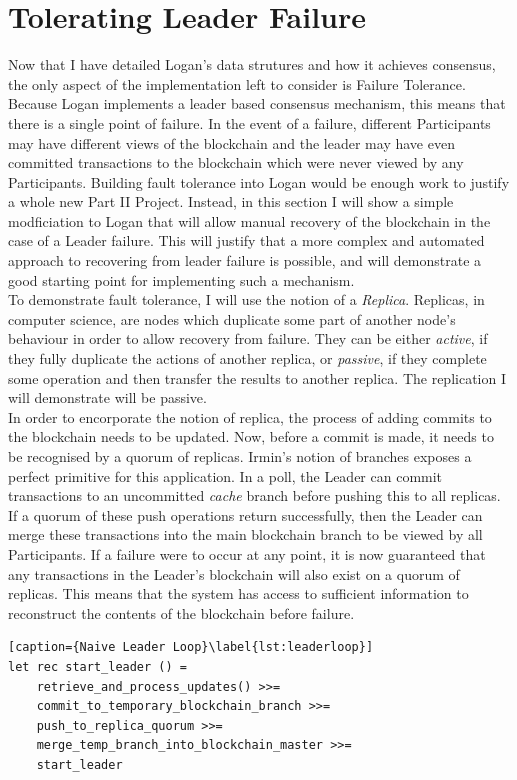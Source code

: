 \documentclass[12pt,a4paper,twoside,openright]{report}
\begin{document}
	\section{Tolerating Leader Failure}
	Now that I have detailed Logan's data strutures and how it achieves consensus, the only aspect of the implementation left to consider is Failure Tolerance.
	Because Logan implements a leader based consensus mechanism, this means that there is a single point of failure.
	In the event of a failure, different Participants may have different views of the blockchain and the leader may have even committed transactions to the blockchain which were never viewed by any Participants. 
	Building fault tolerance into Logan would be enough work to justify a whole new Part II Project. 
	Instead, in this section I will show a simple modficiation to Logan that will allow manual recovery of the blockchain in the case of a Leader failure. 
	This will justify that a more complex and automated approach to recovering from leader failure is possible, and will demonstrate a good starting point for implementing such a mechanism. \\

	To demonstrate fault tolerance, I will use the notion of a \textit{Replica}. 
	Replicas, in computer science, are nodes which duplicate some part of another node's behaviour in order to allow recovery from failure. 
	They can be either \textit{active}, if they fully duplicate the actions of another replica, or \textit{passive}, if they complete some operation and then transfer the results to another replica.
	The replication I will demonstrate will be passive.\\

	In order to encorporate the notion of replica, the process of adding commits to the blockchain needs to be updated.
	Now, before a commit is made, it needs to be recognised by a quorum of replicas.
	Irmin's notion of branches exposes a perfect primitive for this application.
	In a poll, the Leader can commit transactions to an uncommitted \textit{cache} branch before pushing this to all replicas.
	If a quorum of these push operations return successfully, then the Leader can merge these transactions into the main blockchain branch to be viewed by all Participants.
	If a failure were to occur at any point, it is now guaranteed that any transactions in the Leader's blockchain will also exist on a quorum of replicas.
	This means that the system has access to sufficient information to reconstruct the contents of the blockchain before failure.\\
	\begin{minipage}{\linewidth}
	\begin{lstlisting}[caption={Naive Leader Loop}\label{lst:leaderloop}]
let rec start_leader () = 
	retrieve_and_process_updates() >>= 
	commit_to_temporary_blockchain_branch >>=
	push_to_replica_quorum >>=
	merge_temp_branch_into_blockchain_master >>=
	start_leader
	\end{lstlisting}
	\end{minipage}
	\\
\end{document}
